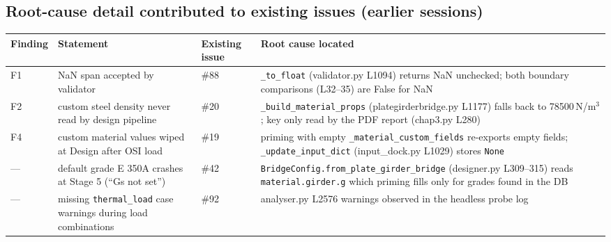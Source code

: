 \subsection{Root-cause detail contributed to existing issues (earlier sessions)}
\begin{longtable}{@{}p{2.6cm}p{5.4cm}p{3.2cm}p{4.2cm}@{}}
\toprule
Finding & Statement & Existing issue & Root cause located \\
\midrule
F1 & NaN span accepted by validator & \#88 & \texttt{\_to\_float} (validator.py L1094) returns NaN unchecked; both boundary comparisons (L32--35) are False for NaN \\
F2 & custom steel density never read by design pipeline & \#20 & \texttt{\_build\_material\_props} (plategirderbridge.py L1177) falls back to 78500\,N/m$^3$; key only read by the PDF report (chap3.py L280) \\
F4 & custom material values wiped at Design after OSI load & \#19 & priming with empty \texttt{\_material\_custom\_fields} re-exports empty fields; \texttt{\_update\_input\_dict} (input\_dock.py L1029) stores \texttt{None} \\
--- & default grade E 350A crashes at Stage 5 (``Gs not set'') & \#42 & \texttt{BridgeConfig.from\_plate\_girder\_bridge} (designer.py L309--315) reads \texttt{material.girder.g} which priming fills only for grades found in the DB \\
--- & missing \texttt{thermal\_load} case warnings during load combinations & \#92 & analyser.py L2576 warnings observed in the headless probe log \\
\bottomrule
\end{longtable}
